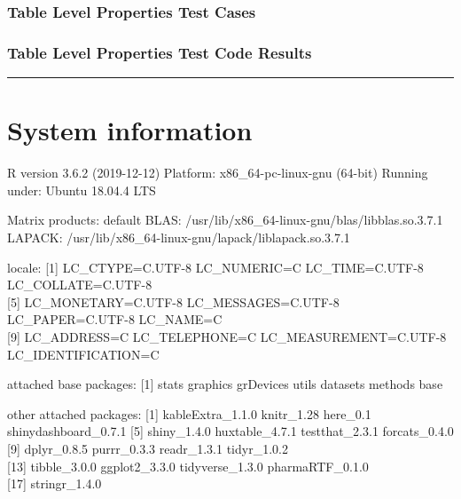 \documentclass[]{article}
\begin{document}
\hypertarget{table-level-properties-test-cases}{%
\subsubsection{Table Level Properties Test
Cases}\label{table-level-properties-test-cases}}

\hypertarget{table-level-properties-test-code-results}{%
\subsubsection{Table Level Properties Test Code
Results}\label{table-level-properties-test-code-results}}

\begin{center}\rule{0.5\linewidth}{0.5pt}\end{center}

\hypertarget{system-information}{%
\section{System information}\label{system-information}}

R version 3.6.2 (2019-12-12) Platform: x86\_64-pc-linux-gnu (64-bit)
Running under: Ubuntu 18.04.4 LTS

Matrix products: default BLAS:
/usr/lib/x86\_64-linux-gnu/blas/libblas.so.3.7.1 LAPACK:
/usr/lib/x86\_64-linux-gnu/lapack/liblapack.so.3.7.1

locale: {[}1{]} LC\_CTYPE=C.UTF-8 LC\_NUMERIC=C LC\_TIME=C.UTF-8
LC\_COLLATE=C.UTF-8\\
{[}5{]} LC\_MONETARY=C.UTF-8 LC\_MESSAGES=C.UTF-8 LC\_PAPER=C.UTF-8
LC\_NAME=C\\
{[}9{]} LC\_ADDRESS=C LC\_TELEPHONE=C LC\_MEASUREMENT=C.UTF-8
LC\_IDENTIFICATION=C

attached base packages: {[}1{]} stats graphics grDevices utils datasets
methods base

other attached packages: {[}1{]} kableExtra\_1.1.0 knitr\_1.28 here\_0.1
shinydashboard\_0.7.1 {[}5{]} shiny\_1.4.0 huxtable\_4.7.1
testthat\_2.3.1 forcats\_0.4.0\\
{[}9{]} dplyr\_0.8.5 purrr\_0.3.3 readr\_1.3.1 tidyr\_1.0.2\\
{[}13{]} tibble\_3.0.0 ggplot2\_3.3.0 tidyverse\_1.3.0
pharmaRTF\_0.1.0\\
{[}17{]} stringr\_1.4.0
\end{document}
